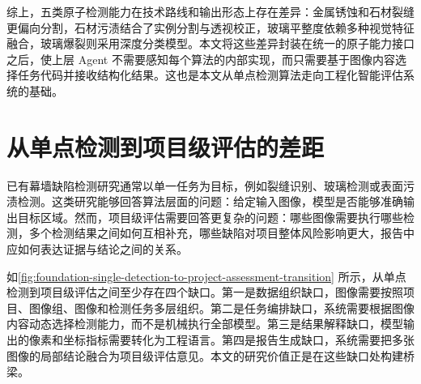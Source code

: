 综上，五类原子检测能力在技术路线和输出形态上存在差异：金属锈蚀和石材裂缝更偏向分割，石材污渍结合了实例分割与透视校正，玻璃平整度依赖多种视觉特征融合，玻璃爆裂则采用深度分类模型。本文将这些差异封装在统一的原子能力接口之后，使上层 Agent 不需要感知每个算法的内部实现，而只需要基于图像内容选择任务代码并接收结构化结果。这也是本文从单点检测算法走向工程化智能评估系统的基础。

\section{从单点检测到项目级评估的差距}
\label{sec:foundation-single-algorithm-to-project-level-assessment-gap}

已有幕墙缺陷检测研究通常以单一任务为目标，例如裂缝识别、玻璃检测或表面污渍检测。这类研究能够回答算法层面的问题：给定输入图像，模型是否能够准确输出目标区域。然而，项目级评估需要回答更复杂的问题：哪些图像需要执行哪些检测，多个检测结果之间如何互相补充，哪些缺陷对项目整体风险影响更大，报告中应如何表达证据与结论之间的关系。

如\cref{fig:foundation-single-detection-to-project-assessment-transition} 所示，从单点检测到项目级评估之间至少存在四个缺口。第一是数据组织缺口，图像需要按照项目、图像组、图像和检测任务多层组织。第二是任务编排缺口，系统需要根据图像内容动态选择检测能力，而不是机械执行全部模型。第三是结果解释缺口，模型输出的像素和坐标指标需要转化为工程语言。第四是报告生成缺口，系统需要把多张图像的局部结论融合为项目级评估意见。本文的研究价值正是在这些缺口处构建桥梁。

